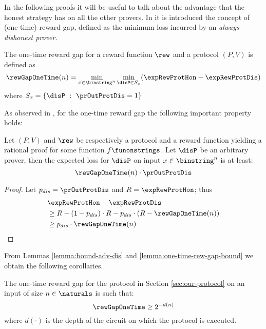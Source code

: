 In the following proofs it will be useful to talk about the advantage 
that 
the honest strategy has on all the other provers. In 
\cite{guo2014rational} it 
is 
introduced the concept of (one-time) reward gap, defined as the minimum 
loss 
incurred 
by an \emph{always dishonest prover}.

\begin{mydef}
\label{def:one-time-rew-gap}
The one-time reward gap for a reward function $\rew$ and a protocol 
$(P,V)$ is defined as
$$ \rewGapOneTime(n) = \min_{x \in \binstring^n} \min_{\disP \in S_x} 
(\expRewProtHon - \expRewProtDis )  $$
where $ S_x = \{ \disP \ :\  \prOutProtDis = 1 \} $
\end{mydef}

As observed in \cite{guo2014rational}, for the one-time reward gap  the 
following important property holds:
\begin{mylemma}
\label{lemma:one-time-rew-gap-bound}
Let $(P,V)$ and $\rew$ be respectively a protocol and a reward function 
yielding a rational proof for some function $f \funonstrings$.
Let $\disP$ be an arbitrary prover, then the expected loss for $\disP$ 
on input $x \in \binstring^n$ is at 
least:
$$ \rewGapOneTime(n)\cdot\prOutProtDis  $$
\end{mylemma}
\begin{proof}
Let $p_{dis} = \prOutProtDis$ and $R = \expRewProtHon$; thus
\begin{align*}
& \expRewProtHon - \expRewProtDis   \\
& \geq   R - (1-p_{dis})\cdot R -
p_{dis}\cdot(R-\rewGapOneTime(n)) \\
& \geq  p_{dis}\cdot\rewGapOneTime(n)
\end{align*}

\end{proof}

From Lemmas \ref{lemma:bound-adv-dis} and \ref{lemma:one-time-rew-gap-bound}
we obtain the following corollaries.
\begin{mycorollary}
The one-time reward gap for the protocol in Section \ref{sec:our-protocol} on 
an input of size $n \in \naturals$ is such that:
$$ \rewGapOneTime \geq 2^{-d(n)}  $$
where $d(\cdot)$ is the depth of the circuit on which the protocol is executed.
\end{mycorollary}



